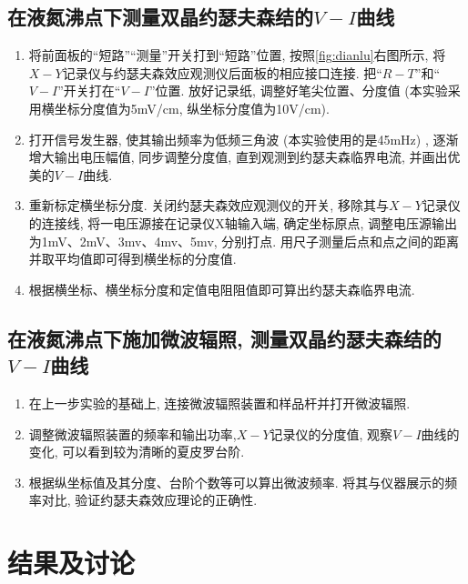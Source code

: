 \documentclass[font=default]{mpltx}
\begin{document}
\subsection{在液氮沸点下测量双晶约瑟夫森结的$V-I$曲线}
\begin{enumerate}
  \item 将前面板的“短路”“测量”开关打到“短路”位置, 按照\autoref{fig:dianlu}右图所示, 将$X-Y$记录仪与约瑟夫森效应观测仪后面板的相应接口连接. 把“$R-T$”和“$V-I$”开关打在“$V-I$”位置. 放好记录纸, 调整好笔尖位置、分度值 (本实验采用横坐标分度值为5mV/cm, 纵坐标分度值为10\miu V/cm). 
  \item 打开信号发生器, 使其输出频率为低频三角波 (本实验使用的是45mHz) , 逐渐增大输出电压幅值, 同步调整分度值, 直到观测到约瑟夫森临界电流, 并画出优美的$V-I$曲线.
  \item 重新标定横坐标分度. 关闭约瑟夫森效应观测仪的开关, 移除其与$X-Y$记录仪的连接线, 将一电压源接在记录仪X轴输入端, 确定坐标原点, 调整电压源输出为1mV、2mV、3mv、4mv、5mv, 分别打点. 用尺子测量后点和点之间的距离并取平均值即可得到横坐标的分度值.
  \item 根据横坐标、横坐标分度和定值电阻阻值即可算出约瑟夫森临界电流.
  
\end{enumerate}



\subsection{在液氮沸点下施加微波辐照, 测量双晶约瑟夫森结的$V-I$曲线}
\begin{enumerate}
  \item 在上一步实验的基础上, 连接微波辐照装置和样品杆并打开微波辐照.
  \item 调整微波辐照装置的频率和输出功率,$X-Y$记录仪的分度值, 观察$V-I$曲线的变化, 可以看到较为清晰的夏皮罗台阶.
  \item 根据纵坐标值及其分度、台阶个数等可以算出微波频率. 将其与仪器展示的频率对比, 验证约瑟夫森效应理论的正确性.
\end{enumerate}


\section{结果及讨论}
\end{document}

